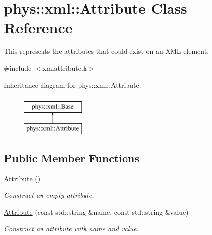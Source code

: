 \hypertarget{classphys_1_1xml_1_1Attribute}{
\section{phys::xml::Attribute Class Reference}
\label{da/ddf/classphys_1_1xml_1_1Attribute}
}


This represents the attributes that could exist on an XML element.  




{\ttfamily \#include $<$xmlattribute.h$>$}

Inheritance diagram for phys::xml::Attribute:\begin{figure}[H]
\begin{center}
\leavevmode
\includegraphics[height=2cm]{da/ddf/classphys_1_1xml_1_1Attribute}
\end{center}
\end{figure}
\subsection*{Public Member Functions}
\begin{DoxyCompactItemize}
\item 
\hypertarget{classphys_1_1xml_1_1Attribute_a962ad273e447bb714925c331e00cc3e7}{
\hyperlink{classphys_1_1xml_1_1Attribute_a962ad273e447bb714925c331e00cc3e7}{Attribute} ()}
\label{da/ddf/classphys_1_1xml_1_1Attribute_a962ad273e447bb714925c331e00cc3e7}

\begin{DoxyCompactList}\small\item\em Construct an empty attribute. \item\end{DoxyCompactList}\item 
\hyperlink{classphys_1_1xml_1_1Attribute_a564df51f8b32ffd1fbd6c69bd278c9a5}{Attribute} (const std::string \&name, const std::string \&value)
\begin{DoxyCompactList}\small\item\em Construct an attribute with name and value. \item\end{DoxyCompactList}\end{DoxyCompactItemize}


